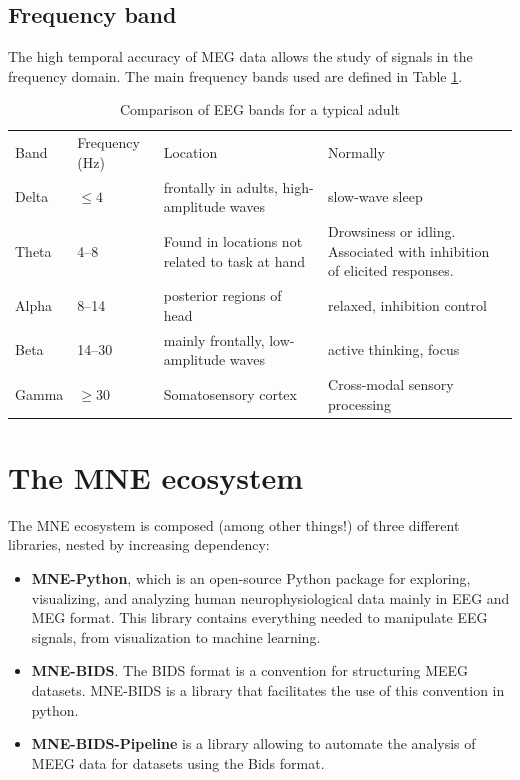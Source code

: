 \subsection{Frequency band}


The high temporal accuracy of MEG data allows the study of signals in the frequency domain. The main frequency bands used are defined in Table \ref{Tab:neural_freq_band}.

\begin{table}[ht]
   \caption{Comparison of EEG bands for a typical adult}
   \centering
   \begin{tabular}{@{}| p{1.2cm}|p{2.5cm}| p{4.5cm}|p{4.5cm}| @{}}
      \hline
      Band  & Frequency (Hz) & Location                                       & Normally                                                                \\
      Delta & $\leq  4$      & frontally in adults, high-amplitude waves      & slow-wave sleep                                                         \\
      Theta & 4–8            & Found in locations not related to task at hand & Drowsiness or idling. Associated with inhibition of elicited responses. \\
      Alpha & 8–14           & posterior regions of head                      & relaxed, inhibition control                                             \\
      Beta  & 14–30          & mainly frontally, low-amplitude waves          & active thinking, focus                                                  \\
      Gamma & $\geq 30$      & Somatosensory cortex                           & Cross-modal sensory processing                                          \\
      \hline
   \end{tabular}
   \label{Tab:neural_freq_band}
\end{table}


\section{The MNE ecosystem}

The MNE ecosystem is composed (among other things!) of three different libraries, nested by increasing dependency:

\begin{itemize}
   \item \textbf{MNE-Python}, which is an open-source Python package for exploring, visualizing, and analyzing human neurophysiological data mainly in EEG and MEG format. This library contains everything needed to manipulate EEG signals, from visualization to machine learning.
   \item \textbf{MNE-BIDS}. The BIDS format is a convention for structuring MEEG datasets. MNE-BIDS is a library that facilitates the use of this convention in python.
   \item \textbf{MNE-BIDS-Pipeline} is a library allowing to automate the analysis of MEEG data for datasets using the Bids format.
\end{itemize}

